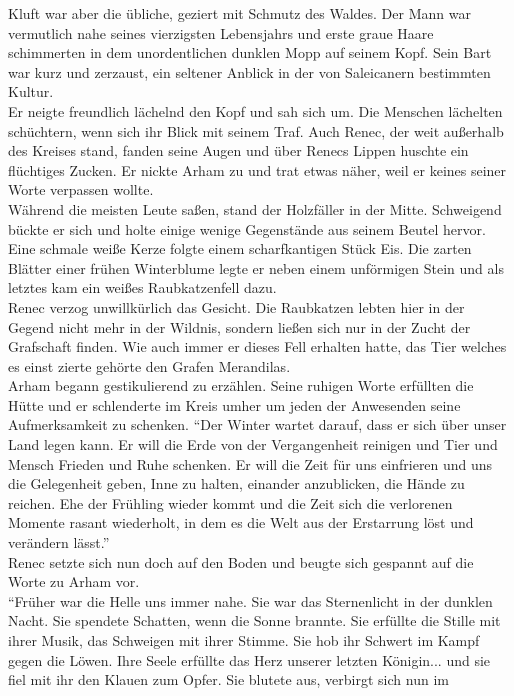 Kluft war aber die übliche, geziert mit Schmutz des Waldes. Der Mann war vermutlich nahe seines 
vierzigsten Lebensjahrs und erste graue Haare schimmerten in dem unordentlichen dunklen Mopp auf 
seinem Kopf. Sein Bart war kurz und zerzaust, ein seltener Anblick in der von Saleicanern bestimmten 
Kultur.\\
Er neigte freundlich lächelnd den Kopf und sah sich um. Die Menschen lächelten schüchtern, wenn sich 
ihr Blick mit seinem Traf. Auch Renec, der weit außerhalb des Kreises stand, fanden seine Augen und 
über Renecs Lippen huschte ein flüchtiges Zucken. Er nickte Arham zu und trat etwas näher, weil er 
keines seiner Worte verpassen wollte.\\
Während die meisten Leute saßen, stand der Holzfäller in der Mitte. Schweigend bückte er sich und 
holte einige wenige Gegenstände aus seinem Beutel hervor. Eine schmale weiße Kerze folgte einem 
scharfkantigen Stück Eis. Die zarten Blätter einer frühen Winterblume legte er neben einem 
unförmigen Stein und als letztes kam ein weißes Raubkatzenfell dazu.\\
Renec verzog unwillkürlich das Gesicht. Die Raubkatzen lebten hier in der Gegend nicht mehr in der 
Wildnis, sondern ließen sich nur in der Zucht der Grafschaft finden. Wie auch immer er dieses Fell 
erhalten hatte, das Tier welches es einst zierte gehörte den Grafen Merandilas.\\
Arham begann gestikulierend zu erzählen. Seine ruhigen Worte erfüllten die Hütte und er schlenderte 
im Kreis umher um jeden der Anwesenden seine Aufmerksamkeit zu schenken. ``Der Winter wartet darauf, 
dass er sich über unser Land legen kann. Er will die Erde von der Vergangenheit reinigen und Tier 
und Mensch Frieden und Ruhe schenken. Er will die Zeit für uns einfrieren und uns die Gelegenheit 
geben, Inne zu halten, einander anzublicken, die Hände zu reichen. Ehe der Frühling wieder kommt und 
die Zeit sich die verlorenen Momente rasant wiederholt, in dem es die Welt aus der Erstarrung löst 
und verändern lässt.''\\
Renec setzte sich nun doch auf den Boden und beugte sich gespannt auf die Worte zu Arham vor.\\
``Früher war die Helle uns immer nahe. Sie war das Sternenlicht in der dunklen Nacht. Sie spendete 
Schatten, wenn die Sonne brannte. Sie erfüllte die Stille mit ihrer Musik, das Schweigen mit ihrer 
Stimme. Sie hob ihr Schwert im Kampf gegen die Löwen. Ihre Seele erfüllte das Herz unserer letzten 
Königin... und sie fiel mit ihr den Klauen zum Opfer. Sie blutete aus, verbirgt sich nun im 
